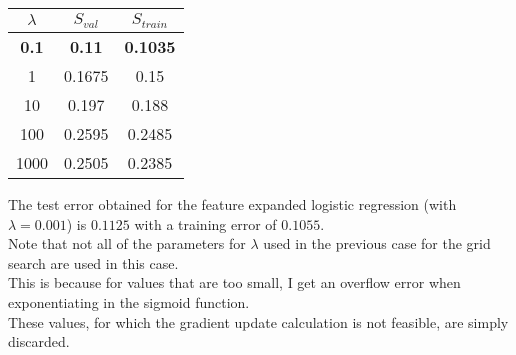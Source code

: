 \begin{center}
    \begin{tabular}{| c | c | c |}
        \hline
        $\lambda$ & $S_{val}$ & $S_{train}$ \\
        \hline
        \textbf{0.1} & \textbf{0.11} & \textbf{0.1035} \\
        \hline
        1 & 0.1675 & 0.15 \\
        \hline
        10 & 0.197 & 0.188 \\
        \hline
        100 & 0.2595 & 0.2485 \\
        \hline
        1000 & 0.2505 & 0.2385 \\
        \hline
    \end{tabular}
\end{center}

The test error obtained for the feature expanded logistic regression (with $\lambda = 0.001$) is $0.1125$ with a training error of $0.1055$.\\
Note that not all of the parameters for $\lambda$ used in the previous case for the grid search are used in this case.\\ 
This is because for values that are too small, I get an overflow error when exponentiating in the sigmoid function.\\ 
These values, for which the gradient update calculation is not feasible, are simply discarded.\\

